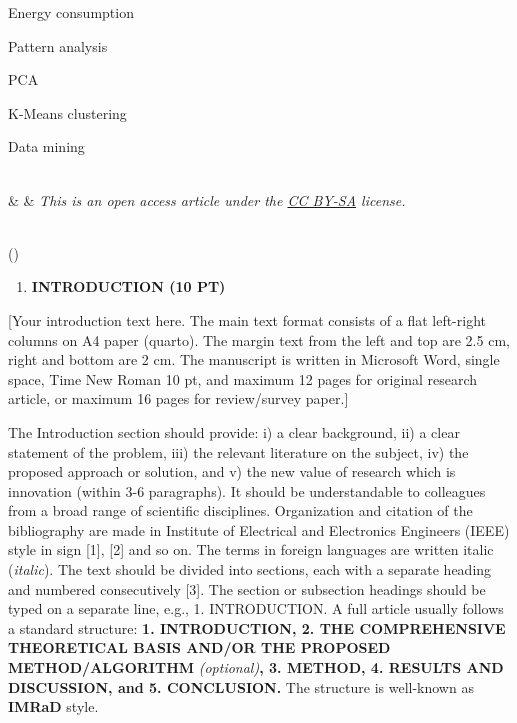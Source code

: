 \documentclass[
]{article}
\begin{document}
\begin{longtable}[]
{Energy consumption

Pattern analysis

PCA

K-Means clustering

Data mining} \\
& & \emph{This is an open access article under the
\href{https://creativecommons.org/licenses/by-sa/4.0/}{CC BY-SA}
license.}

 \\
\bottomrule()
\end{longtable}

\begin{enumerate}
\def\labelenumi{\arabic{enumi}.}
\item
  \textbf{INTRODUCTION (10 PT)}
\end{enumerate}

[Your introduction text here. The main text format consists of a flat left-right columns on A4 paper (quarto). The margin text from the left and top are 2.5 cm, right and bottom are 2 cm. The manuscript is written in Microsoft Word, single space, Time New Roman 10 pt, and maximum 12 pages for original research article, or maximum 16 pages for review/survey paper.]

The Introduction section should provide: i) a clear background, ii) a clear statement of the problem, iii) the relevant literature on the subject, iv) the proposed approach or solution, and v) the new value of research which is innovation (within 3-6 paragraphs). It should be understandable to colleagues from a broad range of scientific disciplines. Organization and citation of the bibliography are made in Institute of Electrical and Electronics Engineers (IEEE) style in sign {[}1{]}, {[}2{]} and so on. The terms in foreign languages are written italic (\emph{italic}). The text should be divided into sections, each with a separate heading and numbered consecutively {[}3{]}. The section or subsection headings should be typed on a separate line, e.g., 1. INTRODUCTION. A full article usually follows a standard structure: \textbf{1. INTRODUCTION, 2. THE COMPREHENSIVE THEORETICAL BASIS AND/OR THE PROPOSED METHOD/ALGORITHM} \emph{(optional)}\textbf{, 3. METHOD, 4. RESULTS AND DISCUSSION, and 5. CONCLUSION.} The structure is well-known as \textbf{IMRaD} style.
\end{document}
